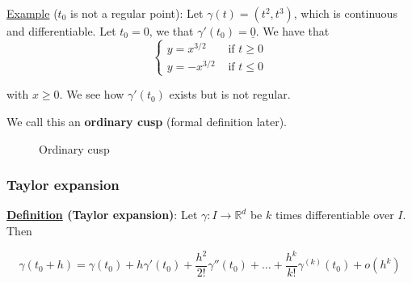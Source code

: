 \documentclass[10pt]{extarticle}
\newcommand{\R}{\mathbb{R}}
\begin{document}
\underline{Example} ($t_0$ is not a regular point):
Let $\gamma(t) = (t^2, t^3)$, which is continuous and differentiable.
Let $t_0 = 0$, we that $\gamma'(t_0) = \underline 0$.
We have that
$$
    \begin{cases}
        y = x^{3/2}  & \text{ if } t \geq 0 \\
        y = -x^{3/2} & \text{ if } t \leq 0
    \end{cases}
$$

with $x \geq 0$. We see how $\gamma'(t_0)$ exists but is not regular.

We call this an \textbf{ordinary cusp} (formal definition later).

\begin{figure}
    \centering
    \caption{Ordinary cusp}
    \label{fig:ordinary_cusp}
\end{figure}

\subsubsection{Taylor expansion}

\textbf{\underline{Definition} (Taylor expansion)}:
Let $\gamma: I \to \R^d$ be $k$ times differentiable over $I$.
Then

$$
    \gamma(t_0 + h) =
    \gamma(t_0) +
    h \gamma'(t_0) +
    \frac{h^2}{2!} \gamma''(t_0) +
    \ldots +
    \frac{h^k}{k!} \gamma^{(k)}(t_0) +
    o(h^k)
$$
\end{document}
